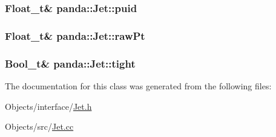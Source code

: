 \label{classpanda_1_1Jet_afe385d15e79676727055af154b8f9812}
\hypertarget{classpanda_1_1Jet_acb4eb662e6590159d1605dfe85aca50a}{
\subsubsection[{puid}]{\setlength{\rightskip}{0pt plus 5cm}Float\_\-t\& {\bf panda::Jet::puid}}}
\label{classpanda_1_1Jet_acb4eb662e6590159d1605dfe85aca50a}
\hypertarget{classpanda_1_1Jet_a59f4da3420588118f746e818ab87bfc7}{
\subsubsection[{rawPt}]{\setlength{\rightskip}{0pt plus 5cm}Float\_\-t\& {\bf panda::Jet::rawPt}}}
\label{classpanda_1_1Jet_a59f4da3420588118f746e818ab87bfc7}
\hypertarget{classpanda_1_1Jet_a4bf0a3b4e1983ad5a1e0a4d63d745896}{
\subsubsection[{tight}]{\setlength{\rightskip}{0pt plus 5cm}Bool\_\-t\& {\bf panda::Jet::tight}}}
\label{classpanda_1_1Jet_a4bf0a3b4e1983ad5a1e0a4d63d745896}


The documentation for this class was generated from the following files:\begin{DoxyCompactItemize}
\item 
Objects/interface/\hyperlink{Jet_8h}{Jet.h}\item 
Objects/src/\hyperlink{Jet_8cc}{Jet.cc}\end{DoxyCompactItemize}
